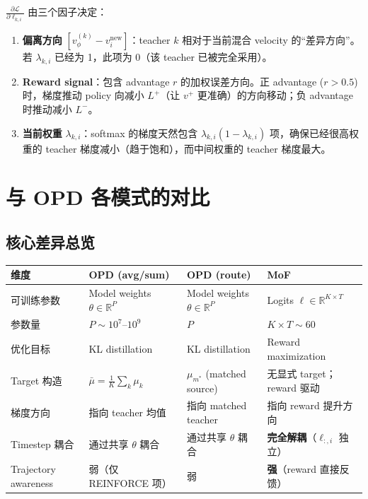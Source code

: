 \documentclass[11pt,a4paper]{article}
\newcommand{\loss}{\mathcal{L}}
\newcommand{\R}{\mathbb{R}}
\newcommand{\vphi}{v_\phi}
\theoremstyle{definition}
\begin{document}
\begin{tcolorbox}[colback=blue!5, colframe=blue!40, title=MoF 梯度的物理含义]
$\frac{\partial \loss}{\partial \ell_{k,i}}$ 由三个因子决定：

\begin{enumerate}[leftmargin=1.5em]
\item \textbf{偏离方向} $[\vphi^{(k)} - v^{\mathrm{new}}_i]$：teacher $k$ 相对于当前混合 velocity 的``差异方向''。若 $\lambda_{k,i}$ 已经为 1，此项为 0（该 teacher 已被完全采用）。

\item \textbf{Reward signal}：包含 advantage $r$ 的加权误差方向。正 advantage ($r > 0.5$) 时，梯度推动 policy 向减小 $L^+$（让 $v^+$ 更准确）的方向移动；负 advantage 时推动减小 $L^-$。

\item \textbf{当前权重} $\lambda_{k,i}$：softmax 的梯度天然包含 $\lambda_{k,i}(1-\lambda_{k,i})$ 项，确保已经很高权重的 teacher 梯度减小（趋于饱和），而中间权重的 teacher 梯度最大。
\end{enumerate}
\end{tcolorbox}

\section{与 OPD 各模式的对比}
\label{sec:comparison}

\subsection{核心差异总览}

\begin{center}
\renewcommand{\arraystretch}{1.6}
\begin{tabular}{@{}p{2.5cm} p{3.5cm} p{3.5cm} p{4cm}@{}}
\toprule
\textbf{维度} & \textbf{OPD (avg/sum)} & \textbf{OPD (route)} & \textbf{MoF} \\
\midrule
可训练参数 & Model weights $\theta \in \R^P$ & Model weights $\theta \in \R^P$ & Logits $\ell \in \R^{K \times T}$ \\
参数量 & $P \sim 10^7$--$10^9$ & $P$ & $K \times T \sim 60$ \\
优化目标 & KL distillation & KL distillation & Reward maximization \\
Target 构造 & $\bar{\mu} = \frac{1}{K}\sum_k \mu_k$ & $\mu_{m^*}$ (matched source) & 无显式 target；reward 驱动 \\
梯度方向 & 指向 teacher 均值 & 指向 matched teacher & 指向 reward 提升方向 \\
Timestep 耦合 & 通过共享 $\theta$ 耦合 & 通过共享 $\theta$ 耦合 & \textbf{完全解耦}（$\ell_{:,i}$ 独立） \\
Trajectory awareness & 弱（仅 REINFORCE 项） & 弱 & \textbf{强}（reward 直接反馈） \\
\bottomrule
\end{tabular}
\end{center}
\end{document}
